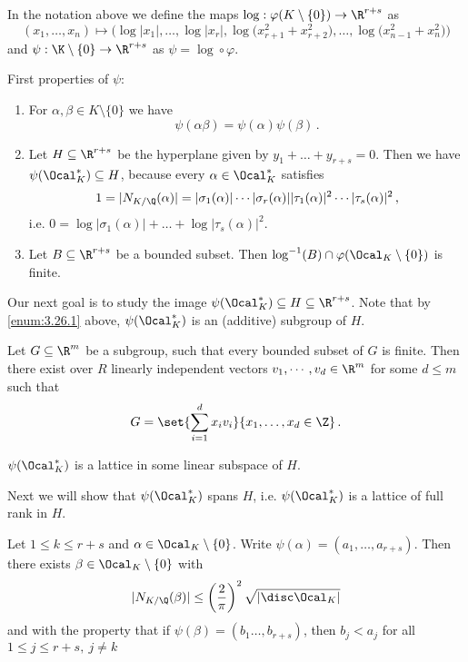 \begin{defn*}
	In the notation above we define the maps \( \log: \varphi(K \setminus \{0\}) \to \R^{r+s} \) as
	\[ (x_1, \dotsc, x_n) \mapsto \Big( \log|x_1|, \dotsc, \log|x_r|, \log \big(x_{r+1}^2 + x_{r+2}^2 \big), \dotsc, \log \big( x_{n-1}^2 + x_n^2 \big) \Big) \]
	and \( \psi: \K \setminus \{0\} \to \R^{r+s} \) as \( \psi = \log \circ \varphi \).
\end{defn*}

First properties of \( \psi \):
\begin{enumerate}[label=(\alph*)]
	\item\label{enum:3.26.1} For \( \alpha,\beta \in K \setminus \{0\} \) we have
		\[ \psi(\alpha \beta) = \psi(\alpha) \psi(\beta) \,. \]
	\item Let \( H \subseteq \R^{r+s} \) be the hyperplane given by \( y_1 + \dots + y_{r+s} = 0 \).
		Then we have \( \psi(\Ocal_K^*) \subseteq H \), because every \( \alpha \in \Ocal_K^* \) satisfies
		\[ 1 = |N_{K/\Q}(\alpha)| = |\sigma_1(\alpha)| \dotsm |\sigma_r(\alpha)| |\tau_1(\alpha)|^2 \dotsm |\tau_s(\alpha)|^2 \,, \]
		i.e. \( 0 = \log|\sigma_1(\alpha)| + \dots + \log|\tau_s(\alpha)|^2 \).
	\item Let \( B \subseteq \R^{r+s} \) be a bounded subset.
		Then \( \log^{-1}(B) \cap \varphi (\Ocal_K \setminus \{0\}) \) is finite.
\end{enumerate}

Our next goal is to study the image \( \psi(\Ocal_K^*) \subseteq H \subseteq \R^{r+s} \).
Note that by \ref{enum:3.26.1} above, \( \psi(\Ocal_K^*) \) is an (additive) subgroup of \( H \).

\begin{lem}
	Let \( G \subseteq \R^m \) be a subgroup, such that every bounded subset of \( G \) is finite.
	Then there exist over \( R \) linearly independent vectors \( v_1, \dotsm, v_d \in \R^m \) for some \( d \leq m \) such that
	\[ G = \set{\sum_{i=1}^d x_i v_i}{x_1, \dotsc, x_d \in \Z} \,. \]
\end{lem}

\begin{cor}
	\( \psi(\Ocal_K^*) \) is a lattice in some linear subspace of \( H \).
\end{cor}

Next we will show that \( \psi(\Ocal_K^*) \) spans \( H \), i.e. \( \psi(\Ocal_K^*) \) is a lattice of full rank in \( H \).

\begin{lem}
	Let \( 1 \leq k \leq r+s \) and \( \alpha \in \Ocal_K \setminus \{0\} \).
	Write \( \psi(\alpha) = (a_1, \dotsc, a_{r+s}) \).
	Then there exists \( \beta \in \Ocal_K \setminus \{0\} \) with
	\[ |N_{K/\Q}(\beta)| \leq \left( \frac{2}{\pi} \right)^2 \sqrt{|\disc \Ocal_K|} \]
	and with the property that if \( \psi(\beta) = (b_1 \dotsc, b_{r+s}) \), then \( b_j < a_j \) for all \( 1 \leq j \leq r+s,\ j \neq k \)
\end{lem}


